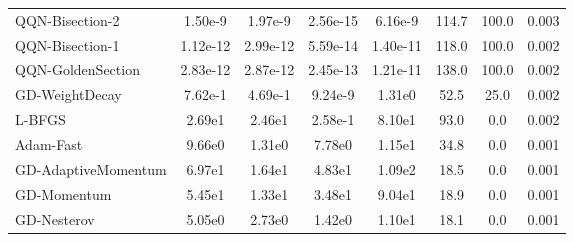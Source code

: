 \documentclass{article}
\begin{document}
\begin{table}[htbp]
{\begin{tabular}{p{2.5cm}*{7}{c}}
QQN-Bisection-2 & 1.50e-9 & 1.97e-9 & 2.56e-15 & 6.16e-9 & 114.7 & 100.0 & 0.003 \\
QQN-Bisection-1 & 1.12e-12 & 2.99e-12 & 5.59e-14 & 1.40e-11 & 118.0 & 100.0 & 0.002 \\
QQN-GoldenSection & 2.83e-12 & 2.87e-12 & 2.45e-13 & 1.21e-11 & 138.0 & 100.0 & 0.002 \\
GD-WeightDecay & 7.62e-1 & 4.69e-1 & 9.24e-9 & 1.31e0 & 52.5 & 25.0 & 0.002 \\
L-BFGS & 2.69e1 & 2.46e1 & 2.58e-1 & 8.10e1 & 93.0 & 0.0 & 0.002 \\
Adam-Fast & 9.66e0 & 1.31e0 & 7.78e0 & 1.15e1 & 34.8 & 0.0 & 0.001 \\
GD-AdaptiveMomentum & 6.97e1 & 1.64e1 & 4.83e1 & 1.09e2 & 18.5 & 0.0 & 0.001 \\
GD-Momentum & 5.45e1 & 1.33e1 & 3.48e1 & 9.04e1 & 18.9 & 0.0 & 0.001 \\
GD-Nesterov & 5.05e0 & 2.73e0 & 1.42e0 & 1.10e1 & 18.1 & 0.0 & 0.001 \\
\bottomrule
\end{tabular}
}
\end{table}
\end{document}
